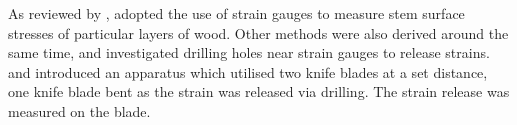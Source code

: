As reviewed by \cite{kubler_1987}, \cite{Okuyama_1981} adopted the use of strain gauges to measure stem surface
stresses of particular layers of wood. Other methods were also derived around
the same time, \cite{gueneau1973}\cite{gueneau1973b} and \cite{kikata1977} investigated drilling holes near strain gauges to release strains.
\cite{Gueneau1974} and \cite{Saurat_1976} introduced an apparatus which utilised two knife
blades at a set distance, one knife blade bent as the strain was released via
drilling. The strain release was measured on the blade. 


